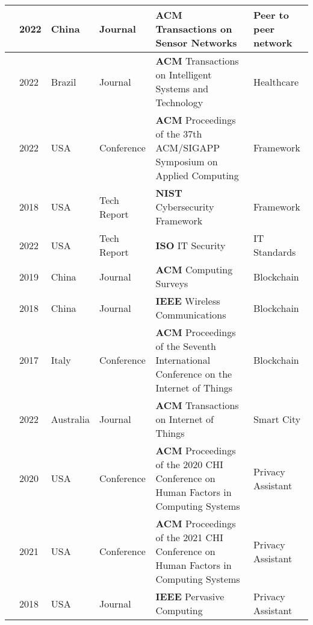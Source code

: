 \begin{footnotesize}
\begin{longtable}{p{1.2cm} p{1cm} p{1.5cm} p{3.2cm} p{5cm} p{3cm}}
        \hline
        \cite{SunSecure} & 2022 & China & Journal & \textbf{ACM} Transactions on Sensor Networks & Peer to peer network \\
        \hline
        \cite{AntunesFederated} & 2022 & Brazil & Journal & \textbf{ACM} Transactions on Intelligent Systems and Technology & Healthcare \\
        \hline
        \cite{opara2022framework} & 2022 & USA & Conference & \textbf{ACM} Proceedings of the 37th ACM/SIGAPP Symposium on Applied Computing & Framework \\
        \hline
        \cite{barrett2018framework} & 2018 & USA & Tech Report & \textbf{NIST} Cybersecurity Framework & Framework \\
        \hline
        \cite{iso2022cybersecurity} & 2022 & USA & Tech Report & \textbf{ISO} IT Security & IT Standards \\
        \hline
        \cite{zhang2019security} & 2019 & China & Journal & \textbf{ACM} Computing Surveys & Blockchain \\
        \hline
        \cite{yu2018blockchain} & 2018 & China & Journal & \textbf{IEEE} Wireless Communications & Blockchain \\
        \hline
        \cite{AliIoT} & 2017 & Italy & Conference & \textbf{ACM} Proceedings of the Seventh International Conference on the Internet of Things & Blockchain \\
        \hline
        \cite{ZhuIntegrating} & 2022 & Australia & Journal & \textbf{ACM} Transactions on Internet of Things & Smart City \\
        \hline
        \cite{ColnagoInforming} & 2020 & USA & Conference & \textbf{ACM} Proceedings of the 2020 CHI Conference on Human Factors in Computing Systems & Privacy Assistant \\
        \hline
        \cite{FengDesign} & 2021 & USA & Conference & \textbf{ACM} Proceedings of the 2021 CHI Conference on Human Factors in Computing Systems & Privacy Assistant \\
        \hline
        \cite{DasPersonalized} & 2018 & USA & Journal & \textbf{IEEE} Pervasive Computing & Privacy Assistant \\

\end{longtable}
\end{footnotesize}
